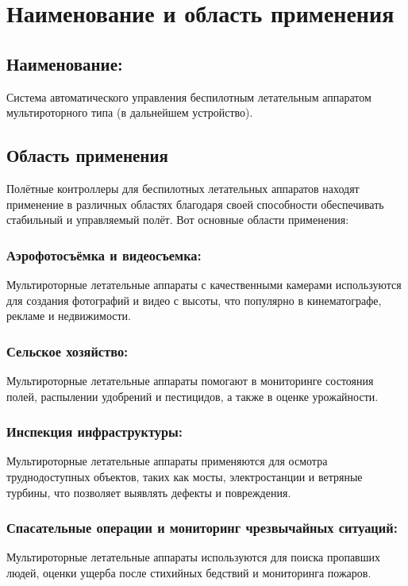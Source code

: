 \documentclass[a4paper]{bsuir-tor}
\begin{document}
\section{Наименование и область применения}
\subsection{Наименование: \newline}

Система автоматического управления беспилотным летательным аппаратом
мультироторного типа (в дальнейшем устройство).



\subsection{Область применения}

Полётные контроллеры для беспилотных летательных аппаратов находят
применение в различных областях благодаря своей способности
обеспечивать стабильный и управляемый полёт. Вот основные области
применения:

\subsubsection{Аэрофотосъёмка и видеосъемка: }
Мультироторные летательные аппараты с качественными камерами
используются для создания фотографий и видео с высоты, что популярно в
кинематографе, рекламе и недвижимости.

\subsubsection{Сельское хозяйство: }
Мультироторные летательные аппараты помогают в мониторинге состояния
полей, распылении удобрений и пестицидов, а также в оценке
урожайности.

\subsubsection{Инспекция инфраструктуры: }
Мультироторные летательные аппараты применяются для осмотра
труднодоступных объектов, таких как мосты, электростанции и ветряные
турбины, что позволяет выявлять дефекты и повреждения.

\subsubsection{Спасательные операции и мониторинг чрезвычайных ситуаций: }
Мультироторные летательные аппараты используются для поиска пропавших
людей, оценки ущерба после стихийных бедствий и мониторинга пожаров.
\end{document}
